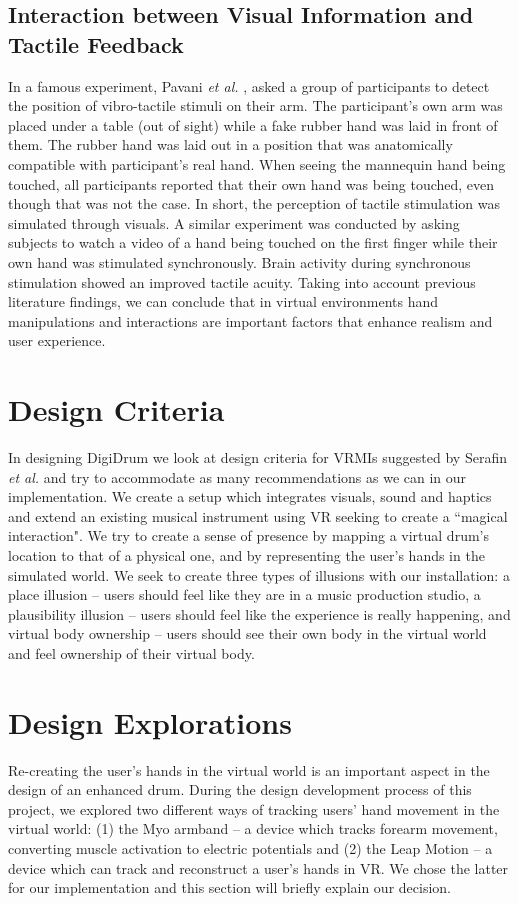 \documentclass{article}
\begin{document}
\subsection{Interaction between Visual Information and Tactile Feedback}
In a famous experiment, Pavani \emph{et al.} \cite{Pavani2000},  asked a group of participants to detect the position of vibro-tactile stimuli on their arm. The participant's own arm was placed under a table (out of sight) while a fake rubber hand was laid in front of them. The rubber hand was laid out in a position that was anatomically compatible with participant's real hand. When seeing the mannequin hand being touched, all participants reported that their own hand was being touched, even though that was not the case. In short, the perception of tactile stimulation was simulated through visuals. A similar experiment was conducted by \cite{Schaefer2006} asking subjects to watch a video of a hand being touched on the first finger while their own hand was stimulated synchronously. Brain activity during synchronous stimulation showed an improved tactile acuity. Taking into account previous literature findings, we can conclude that in virtual environments hand manipulations and interactions are important factors that enhance realism and user experience. 


\section{Design Criteria}\label{sec:Design_criteria}

In designing DigiDrum we look at design criteria for VRMIs suggested by Serafin \emph{et al.} \cite{Serafin:2016} and try to accommodate as many recommendations as we can in our implementation. We create a setup which integrates visuals, sound and haptics and extend an existing musical instrument using VR seeking to create a ``magical interaction". We try to create a sense of presence by mapping a virtual drum's location to that of a physical one, and by representing the user's hands in the simulated world. We seek to create three types of illusions with our installation: a place illusion -- users should feel like they are in a music production studio, a plausibility illusion -- users should feel like the experience is really happening, and virtual body ownership -- users should see their own body in the virtual world and feel ownership of their virtual body.

\section{Design Explorations}\label{sec:desex}
Re-creating the user's hands in the virtual world is an important aspect in the design of an enhanced drum. During the design development process of this project, we explored two different ways of tracking users' hand movement in the virtual world: (1) the Myo armband -- a device which tracks forearm movement, converting muscle activation to electric potentials and (2) the Leap Motion -- a device which can track and reconstruct a user's hands in VR. We chose the latter for our implementation and this section will briefly explain our decision. 
\end{document}
